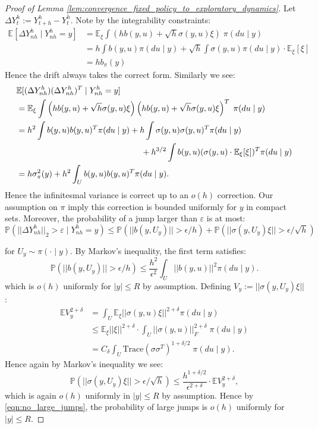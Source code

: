 \documentclass[11pt,oneside,reqno]{article}
\theoremstyle{plain}
\theoremstyle{definition}
\numberwithin{equation}{section}
\renewcommand{\leq}{\leqslant}
\newcommand{\eps}{\varepsilon}
\newcommand{\E}{\mathbb{E}}
\renewcommand{\P}{\mathbb{P}}
\begin{document}
\begin{proof}[Proof of Lemma \ref{lem:convergence_fixed_policy_to_exploratory_dynamics}]
	
	 Let $\Delta Y^h_t := Y^h_{t+h} - Y^h_t$. Note by the integrability constraints:
	\begin{align*}
		\E [\Delta Y^h_{nh} \mid Y^h_{nh} = y]  & = \E_\xi \int \left(hb(y, u) + \sqrt{h} \sigma(y,u) \xi \right) \; \pi(du \mid y)\\
		& = h \int b(y,u) \pi(du \mid y) + \sqrt{h} \int \sigma(y,u) \pi(du \mid y) \cdot \E_\xi[\xi]\\
		& = h b_\pi(y)
	\end{align*}
	\noindent Hence the drift always takes the correct form. Similarly we see:
	\begin{align*}
			& \E [(\Delta Y^h_{nh}) (\Delta Y^h_{nh})^T  \mid Y^h_{nh} = y] \\
			& = \E_\xi \int \left(hb(y,u) + \sqrt{h} \sigma(y,u) \xi \right) \left(hb(y,u) + \sqrt{h} \sigma(y,u) \xi \right)^T \; \pi(du \mid y) \\
				& = h^2 \int b(y,u) b(y,u)^T \pi(du \mid y) + h \int \sigma(y,u) \sigma(y,u)^T \pi(du \mid y) \\
				& \hspace{2.08in} + h^{3/2} \int b(y,u) (\sigma(y,u) \cdot \E_\xi[\xi])^T \pi(du \mid y)\\
			& =  h \sigma_\pi^2(y) + h^2 \int_U b(y,u) b(y,u)^T \pi(du \mid y).
	\end{align*}
	\noindent Hence the infinitesmal variance is correct up to an $o(h)$ correction. Our assumption on $\pi$ imply this correction is bounded uniformly for $y$ in compact sets.
	Moreover, the probability of a jump larger than $\eps$ is at most: 
	\begin{equation}
		\P\left(||\Delta Y^h_{nh}||_2 > \eps \mid Y^h_{nh} = y\right)  \leq \P(||b(y, U_y)|| > \epsilon / h) + \P(||\sigma(y, U_y) \xi|| > \epsilon / \sqrt{h})
		\label{eqn:no_large_jumps}
	\end{equation}

	\noindent for $U_y \sim \pi(\cdot \mid y)$. By Markov's inequality, the first term satisfies:
		\[\P(||b(y, U_y)|| > \epsilon / h) \leq \frac{h^2}{\epsilon^2} \int_U ||b(y,u)||^2 \pi(du \mid y).\]
	\noindent which is $o(h)$ uniformly for $|y| \leq R$ by assumption. Defining $V_y := ||\sigma(y, U_y) \xi||$:
	\begin{align*}
		\E V_y^{2+\delta} & = \int_U \E_\xi ||\sigma(y,u) \xi ||^{2+\delta} \pi(du \mid y)\\
		 & \leq \E_\xi ||\xi||^{2+\delta} \cdot \int_U  ||\sigma(y,u)||_F^{2+\delta} \;  \pi(du \mid y)\\
		 & = C_\delta \int_U \mathrm{Trace}(\sigma \sigma^T)^{1+\delta/2} \;  \pi(du \mid y). 
	\end{align*}
	\noindent Hence again by Markov's inequality we see:
	\[ \P(||\sigma(y, U_y) \xi|| > \epsilon / \sqrt{h}) \leq \frac{h^{1+\delta/2}}{\epsilon^{2+\delta}} \cdot \E V_y^{2+\delta},\]
	\noindent which is again $o(h)$ uniformly in $|y| \leq R$ by assumption. Hence by \eqref{eqn:no_large_jumps}, the probability of large 
	jumps is $o(h)$ uniformly for $|y| \leq R$. 
	

\end{proof}
\end{document}
